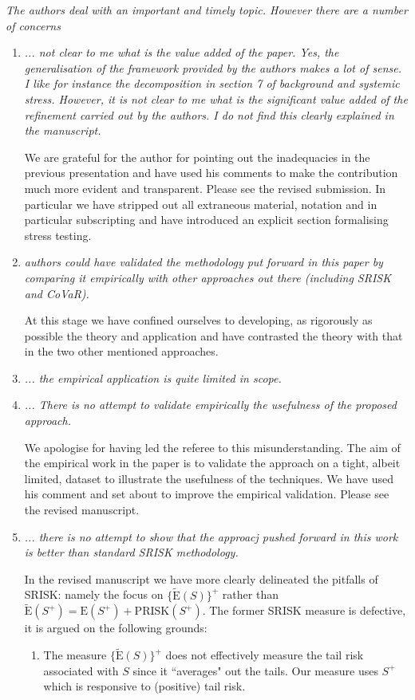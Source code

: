 \documentclass[11pt]{amsart}
\newcommand{\E}{{\mathrm E}}
\newcommand{\Es}{\widetilde\E}
\newcommand{\pr}{\ensuremath{\mathrm{PRISK}}}
\begin{document}
 {\it The authors deal with an important and timely topic.  However there are  a number of concerns}
\begin{enumerate}
\item {\it ... not clear to me what is the value added of the paper. Yes, the generalisation of the framework provided by the authors makes a lot of sense. I like for instance the decomposition in section 7 of background and systemic stress. However, it is not clear to me what is the significant value added of the refinement carried out by the authors. I do not find this clearly explained in the manuscript.}

We are grateful for the author for pointing out the inadequacies in the previous presentation and have used his comments to make the contribution much more evident and transparent.   Please see the revised submission.  In particular we have stripped out all extraneous material, notation and in particular subscripting and have introduced an explicit section formalising stress testing.

\item  {\it authors could have validated the methodology put forward in this paper by comparing it empirically with other approaches out there (including SRISK and CoVaR).}

At this stage we have confined ourselves to developing, as rigorously as possible the theory and application and have contrasted the theory with that in the two other mentioned approaches.

\item  {\it ... the empirical application is quite limited in scope.}

\item {\it ...  There is no attempt to validate empirically the usefulness of the proposed approach.}

We apologise for having led the referee to this misunderstanding.   The aim of the empirical work in the paper is to validate the approach on a tight, albeit limited, dataset to illustrate the usefulness of the techniques.    We have used his comment and set about to improve the empirical validation.  Please see the revised manuscript.  

\item {\it ...  there is no attempt to show that the approacj pushed forward in this work is better than standard SRISK methodology.}

In the revised manuscript we have more clearly delineated the pitfalls of SRISK:  namely the focus on $\{\Es(S)\}^+$ rather than 
$\Es(S^+)=\E(S^+)+\pr(S^+)$.  The former SRISK measure is defective, it is argued on the following grounds:
\begin{enumerate}
\item  The measure $\{\Es(S)\}^+$ does not effectively measure the tail risk associated with $S$ since it ``averages" out the tails.  Our measure uses $S^+$ which is responsive to (positive) tail risk.


\end{enumerate}
\end{enumerate}
\end{document}
